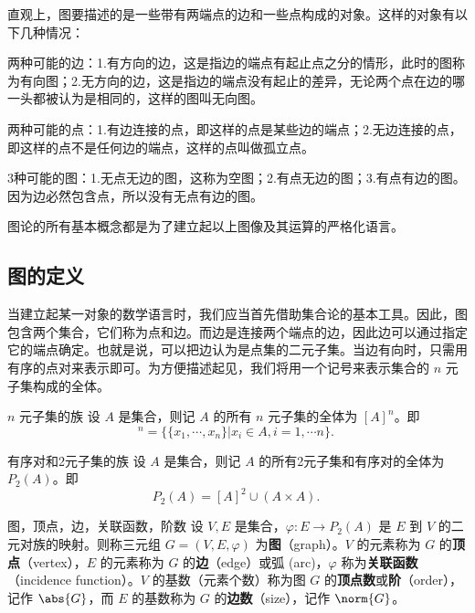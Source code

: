 


\cite{graph1}\cite{graph2}直观上，图要描述的是一些带有两端点的边和一些点构成的对象。这样的对象有以下几种情况：

两种可能的边：1.有方向的边，这是指边的端点有起止点之分的情形，此时的图称为有向图；2.无方向的边，这是指边的端点没有起止的差异，无论两个点在边的哪一头都被认为是相同的，这样的图叫无向图。

两种可能的点：1.有边连接的点，即这样的点是某些边的端点；2.无边连接的点，即这样的点不是任何边的端点，这样的点叫做孤立点。

3种可能的图：1.无点无边的图，这称为空图；2.有点无边的图；3.有点有边的图。因为边必然包含点，所以没有无点有边的图。

图论的所有基本概念都是为了建立起以上图像及其运算的严格化语言。


\subsection{图的定义}

当建立起某一对象的数学语言时，我们应当首先借助集合论的基本工具。因此，图包含两个集合，它们称为点和边。而边是连接两个端点的边，因此边可以通过指定它的端点确定。也就是说，可以把边认为是点集的二元子集。当边有向时，只需用有序的点对来表示即可。为方便描述起见，我们将用一个记号来表示集合的 $n$ 元子集构成的全体。

\begin{definition}{$n$ 元子集的族}
设 $A$ 是集合，则记 $A$ 的所有 $n$ 元子集的全体为 $[A]^n$。即
\begin{equation}
[A]^n=\{\{x_1,\cdots,x_n\}|x_i\in A,i=1,\cdots n\}.~
\end{equation}
\end{definition}

\begin{definition}{有序对和2元子集的族}
设 $A$ 是集合，则记 $A$ 的所有2元子集和有序对的全体为 $P_2(A)$。即
\begin{equation}
P_2(A)=[A]^2\cup (A\times A).~
\end{equation}

\end{definition}




\begin{definition}{图，顶点，边，关联函数，阶数}
设 $V,E$ 是集合，$\varphi:E\rightarrow P_2(A)$ 是 $E$ 到 $V$ 的二元对族的映射。则称三元组 $G=(V,E,\varphi)$ 为\textbf{图}（graph）。$V$ 的元素称为 $G$ 的\textbf{顶点}（vertex），$E$ 的元素称为 $G$ 的\textbf{边}（edge）或弧 (arc)，$\varphi$ 称为\textbf{关联函数}（incidence function）。$V$ 的基数（元素个数）称为图 $G$ 的\textbf{顶点数}或\textbf{阶}（order），记作 $\abs{G}$，而 $E$ 的基数称为 $G$ 的\textbf{边数}（size），记作 $\norm{G}$。
\end{definition}



